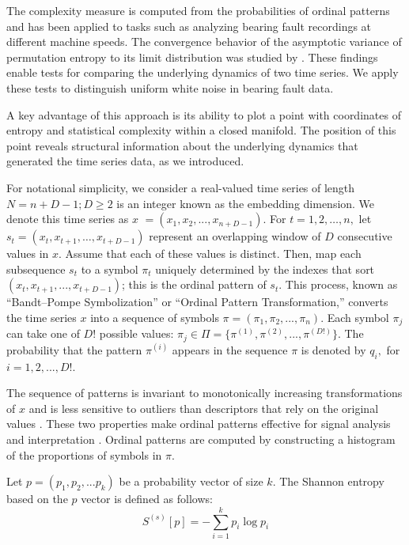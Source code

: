 \documentclass[sn-basic,pdflatex]{sn-jnl}
\theoremstyle{remark}
\theoremstyle{definition}
\begin{document}
The complexity measure is computed from the probabilities of ordinal
patterns and has been applied to tasks such as analyzing bearing fault
recordings at different machine speeds. The convergence behavior of the
asymptotic variance of permutation entropy to its limit distribution was
studied by \citep{REY2024115481}. These findings enable tests for
comparing the underlying dynamics of two time series. We apply these
tests to distinguish uniform white noise in bearing fault data.

A key advantage of this approach is its ability to plot a point with
coordinates of entropy and statistical complexity within a closed
manifold. The position of this point reveals structural information
about the underlying dynamics that generated the time series data, as we
introduced.

For notational simplicity, we consider a real-valued time series of
length \(N=n+D-1; D\ge2\) is an integer known as the embedding
dimension. We denote this time series as \textbf{\(x\)}
\(= (x_1, x_2, ..., x_{n+D-1})\). For \(t=1, 2, …,n,\) let
\(s_t = (x_t,x_{t+1},…,x_{t+D-1})\) represent an overlapping window of
\(D\) consecutive values in \(x\). Assume that each of these values is
distinct. Then, map each subsequence \(s_t\) to a symbol \(\pi_t\)
uniquely determined by the indexes that sort
\((x_t, x_{t+1}, ..., x_{t+D-1})\); this is the ordinal pattern of
\(s_t\). This process, known as ``Bandt--Pompe Symbolization'' or
``Ordinal Pattern Transformation,'' converts the time series
\textbf{\(x\)} into a sequence of symbols
\(\pi=(\pi_1, \pi_2, ..., \pi_n)\). Each symbol \(\pi_j\) can take one
of \(D!\) possible values:
\(\pi_j \in \Pi=\{\pi^{(1)}, \pi^{(2)}, ..., \pi^{(D!)}\}\). The
probability that the pattern \(\pi^{(i)}\) appears in the sequence
\textbf{\(\pi\)} is denoted by \(q_i,\) for \(i=1,2, ..., D!\).

The sequence of patterns is invariant to monotonically increasing
transformations of \textbf{\(x\)} and is less sensitive to outliers than
descriptors that rely on the original values \citep{chagas2022white}.
These two properties make ordinal patterns effective for signal analysis
and interpretation \citep{amigo2023ordinal}. Ordinal patterns are
computed by constructing a histogram of the proportions of symbols in
\textbf{\(\pi\)}.

Let \(p=(p_1 ,p_2 ,... p_k)\) be a probability vector of size \(k\). The
Shannon entropy based on the \(p\) vector is defined as follows:
\begin{equation}
S^{(s)}[p]=-\sum_{i=1}^{k}{p_i \log p_i}
\end{equation}
\end{document}
